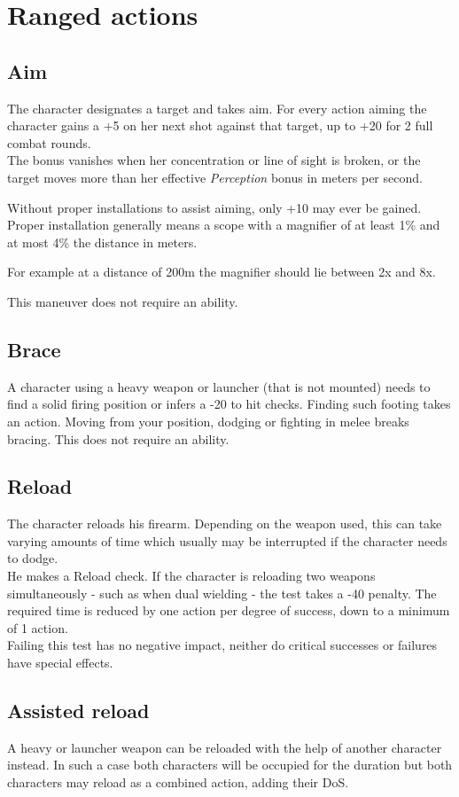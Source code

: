 \section{Ranged actions}
\subsection*{Aim}
The character designates a target and takes aim.
For every action aiming the character
	gains a +5 on her next shot against that target,
	up to +20 for 2 full combat rounds.\\
The bonus vanishes when her concentration or line of sight is broken, or the target moves more than her effective \emph{Perception} bonus in meters per second.
\par
Without proper installations to assist aiming, only +10 may ever be gained.
Proper installation generally means a scope with a magnifier of
	at least 1\%
	and at most 4\%
	the distance in meters.\\
\begin{exampleblock}
	For example at a distance of 200m the magnifier should lie between
		2x and 8x.
\end{exampleblock}
This maneuver does not require an ability.
\subsection*{Brace}
A character using a heavy weapon or launcher (that is not mounted)
	needs to find a solid firing position or infers a -20 to hit checks.
Finding such footing takes an action.
Moving from your position, dodging or fighting in melee breaks bracing.
This does not require an ability.
\subsection*{Reload}
The character reloads his firearm. Depending on the weapon used, this can take varying amounts of time which usually may be interrupted if the character needs to dodge.\\
He makes a Reload check. If the character is reloading two weapons simultaneously - such as when dual wielding - the test takes a -40 penalty.
The required time is reduced by one action per degree of success,
	down to a minimum of 1 action.\\
Failing this test has no negative impact, neither do critical successes or failures have special effects.
\subsection*{Assisted reload}
A heavy or launcher weapon can be reloaded with the help of another character instead. In such a case both characters will be occupied for the duration but both characters may reload as a combined action, adding their DoS.
